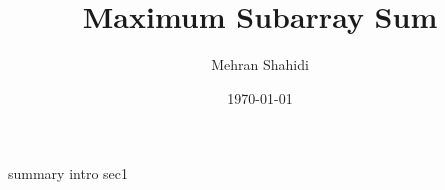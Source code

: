 \documentclass{article}
\title{Maximum Subarray Sum}
\author{Mehran Shahidi}
\date{\today}
\begin{document}
\maketitle
{}
{summary}
\newpage
\tableofcontents
\newpage
{}
{intro}
{sec1}

\newpage
\end{document}
